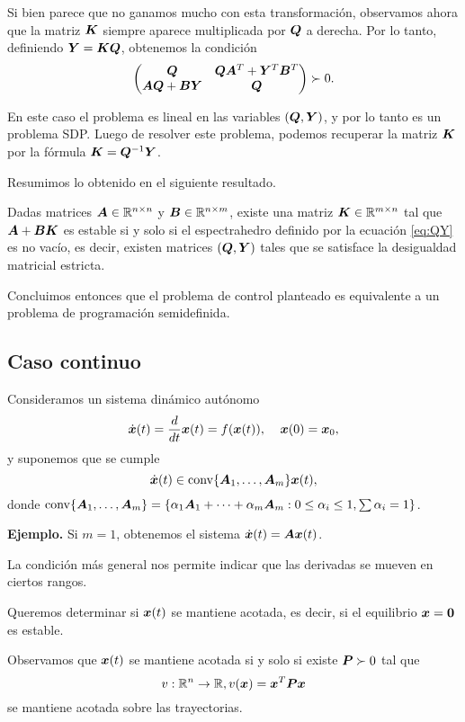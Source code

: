 Si bien parece que no ganamos mucho con esta transformación, observamos ahora que la matriz $\bm{K}$ siempre aparece multiplicada por $\bm{Q}$ a derecha. Por lo tanto, definiendo $\bm{Y} = \bm{K}\bm{Q}$, obtenemos la condición
\begin{equation}
\label{eq:QY}
\begin{pmatrix}
\bm{Q} & \bm{Q}\bm{A}^T + \bm{Y}^T\bm{B}^T  \\
\bm{A}\bm{Q} + \bm{B}\bm{Y} & \bm{Q}
\end{pmatrix}  \succ 0.
\end{equation}

En este caso el problema es lineal en las variables $(\bm{Q}, \bm{Y})$, y por lo tanto es un problema SDP. Luego de resolver este problema, podemos recuperar la matriz $\bm{K}$ por la fórmula $\bm{K} = \bm{Q}^{-1}\bm{Y}$.

Resumimos lo obtenido en el siguiente resultado.

\begin{theorem}
Dadas matrices $\bm{A} \in \mathbb{R}^{n\times n}$ y $\bm{B} \in \mathbb{R}^{n \times m}$, existe una matriz $\bm{K} \in \mathbb{R}^{m \times n}$ tal que $\bm{A} + \bm{B}\bm{K}$ es estable si y solo si el espectrahedro definido por la ecuación \ref{eq:QY} es no vacío, es decir, existen matrices $(\bm{Q}, \bm{Y})$ tales que se satisface la desigualdad matricial estricta.
\end{theorem}

Concluimos entonces que el problema de control planteado es equivalente a un problema de programación semidefinida.

\subsection{Caso continuo}

Consideramos un sistema dinámico autónomo
$$
\dot{\bm{x}}(t) = \frac{d}{dt}{\bm{x}(t)} =f(\bm{x}(t)),\;\;\;\;\bm{x}(0)=\bm{x}_{0},
$$
y suponemos que se cumple
$$
\dot{\bm{x}}(t)  \in \operatorname{conv}\{\bm{A}_1, \dots, \bm{A}_m\} \bm{x}(t),
$$
donde $\operatorname{conv}\{\bm{A}_1, \dots, \bm{A}_m\} = \{\alpha_1 \bm{A}_1 + \dots + \alpha_m \bm{A}_m : 0 \le \alpha_i \le 1, \sum \alpha_i = 1\}$.

\textbf{Ejemplo.} Si $m = 1$, obtenemos el sistema $\dot{\bm{x}}(t) = \bm{A} \bm{x}(t)$.

La condición más general nos permite indicar que las derivadas se mueven en ciertos rangos.

Queremos determinar si $\bm{x}(t)$ se mantiene acotada, es decir, si el equilibrio $\bm{x} = \bm{0}$ es estable.

Observamos que $\bm{x}(t)$ se mantiene acotada si y solo si existe $\bm{P} \succ 0$ tal que
$$
v: \mathbb{R}^n \rightarrow \mathbb{R}, v(\bm{x}) = \bm{x}^T \bm{P} \bm{x}
$$
se mantiene acotada sobre las trayectorias.

